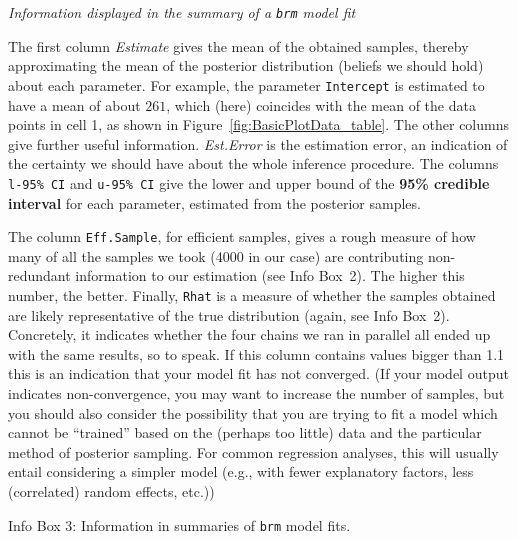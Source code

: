 \documentclass[nobib]{tufte-handout}
\begin{document}
\begin{InfoBox}[t]
\centering
\colorbox{mygray}{\centering
  \begin{minipage}{1.0\textwidth}

    \emph{Information displayed in the summary of a \texttt{brm} model fit}
    \medskip

    The first column \emph{Estimate} gives the mean of the obtained samples, thereby
    approximating the mean of the posterior distribution (beliefs we should hold) about each
    parameter. For example, the parameter \texttt{Intercept} is estimated to have a mean of
    about $261$, which (here) coincides with the mean of the data points in cell 1, as shown in
    Figure~\ref{fig:BasicPlotData_table}. The other columns give further useful information.
    \emph{Est.Error} is the estimation error, an indication of the certainty we should have
    about the whole inference procedure. The columns \texttt{l-95\% CI} and \texttt{u-95\% CI}
    give the lower and upper bound of the \textbf{95\% credible interval} for each parameter,
    estimated from the posterior samples.

    The column \texttt{Eff.Sample}, for efficient samples, gives a rough measure of how many of
    all the samples we took (4000 in our case) are contributing non-redundant information to
    our estimation (see Info Box~2). The higher this number, the better. Finally, \texttt{Rhat}
    is a measure of whether the samples obtained are likely representative of the true
    distribution (again, see Info Box~2). Concretely, it indicates whether the four chains we
    ran in parallel all ended up with the same results, so to speak. If this column contains
    values bigger than 1.1 this is an indication that your model fit has not converged. (If
    your model output indicates non-convergence, you may want to increase the number of
    samples, but you should also consider the possibility that you are trying to fit a model
    which cannot be ``trained'' based on the (perhaps too little) data and the particular
    method of posterior sampling. For common regression analyses, this will usually entail
    considering a simpler model (e.g., with fewer explanatory factors, less (correlated) random
    effects, etc.))
    
  \end{minipage} \par
  } \par
  \begin{center}
    Info Box 3: Information in summaries of \texttt{brm} model fits.
  \end{center}
\end{InfoBox}
\end{document}
